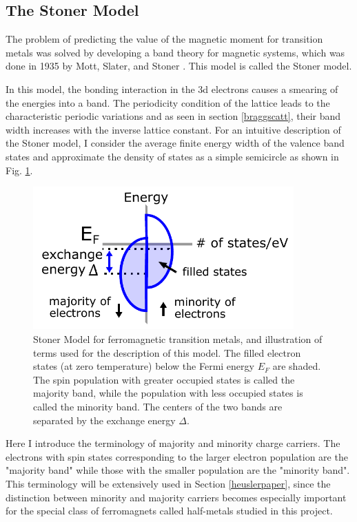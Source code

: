 \subsection{The Stoner Model}
The problem of predicting the value of the magnetic moment for transition metals was solved by developing a band theory for magnetic systems, which was done in 1935 by Mott, Slater, and Stoner \cite{Slater1936,Slater1936a,Stoner1936,Heisenberg1937,Mott1935}. This model is called the Stoner model. 

In this model, the bonding interaction in the 3d electrons causes a smearing of the energies into a band. The periodicity condition of the lattice leads to the characteristic periodic variations and as seen in section \ref{braggscatt}, their band width increases with the inverse lattice constant. For an intuitive description of the Stoner model, I consider the average finite energy width of the valence band states and approximate the density of states as a simple semicircle as shown in Fig. \ref{StonerModel}.

\begin{figure}
	\begin{center}
		\includegraphics[width=100mm]{figs/StonerModel.pdf}
	\end{center}
	\caption{Stoner Model for ferromagnetic transition metals, and illustration of terms used for the description of this model. The filled electron states (at zero temperature) below the Fermi energy $E_F$ are shaded. The spin population with greater occupied states is called the majority band, while the population with less occupied states is called the minority band. The centers of the two bands are separated by the exchange energy $\Delta$.}
	\label{StonerModel}
\end{figure}

Here I introduce the terminology of majority and minority charge carriers. The electrons with spin states corresponding to the larger electron population are the "majority band" while those with the smaller population are the "minority band". This terminology will be extensively used in Section \ref{heuslerpaper}, since the distinction between minority and majority carriers becomes especially important for the special class of ferromagnets called half-metals studied in this project.

